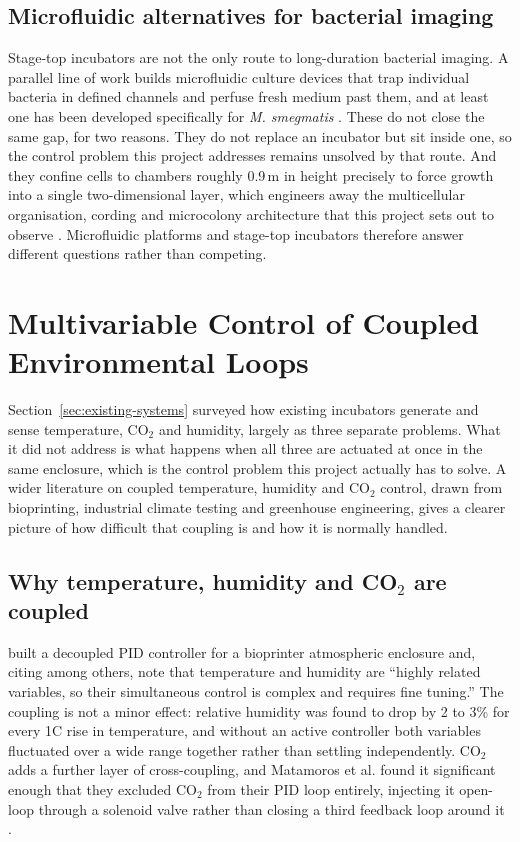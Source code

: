 \subsection{Microfluidic alternatives for bacterial imaging}
\label{subsec:microfluidic-alternatives}

Stage-top incubators are not the only route to long-duration bacterial imaging. A parallel line of work builds microfluidic culture devices that trap individual bacteria in defined channels and perfuse fresh medium past them, and at least one has been developed specifically for \textit{M. smegmatis} \citep{wang2021development,golchin_microfluidic_2012}. These do not close the same gap, for two reasons. They do not replace an incubator but sit inside one, so the control problem this project addresses remains unsolved by that route. And they confine cells to chambers roughly 0.9\,\textmu m in height precisely to force growth into a single two-dimensional layer, which engineers away the multicellular organisation, cording and microcolony architecture that this project sets out to observe \citep{wang2021development}. Microfluidic platforms and stage-top incubators therefore answer different questions rather than competing.

\section{Multivariable Control of Coupled Environmental Loops}
\label{sec:multivariable-control}

Section~\ref{sec:existing-systems} surveyed how existing incubators generate and sense temperature, CO$_2$ and humidity, largely as three separate problems. What it did not address is what happens when all three are actuated at once in the same enclosure, which is the control problem this project actually has to solve. A wider literature on coupled temperature, humidity and CO$_2$ control, drawn from bioprinting, industrial climate testing and greenhouse engineering, gives a clearer picture of how difficult that coupling is and how it is normally handled.

\subsection{Why temperature, humidity and CO$_2$ are coupled}
\label{subsec:why-coupled}

\citet{matamoros_temperature_2020} built a decoupled PID controller for a bioprinter atmospheric enclosure and, citing \citet{yinping_expert_2017} among others, note that temperature and humidity are ``highly related variables, so their simultaneous control is complex and requires fine tuning.'' The coupling is not a minor effect: relative humidity was found to drop by 2 to 3\% for every 1\textdegree{}C rise in temperature, and without an active controller both variables fluctuated over a wide range together rather than settling independently. CO$_2$ adds a further layer of cross-coupling, and Matamoros et al. found it significant enough that they excluded CO$_2$ from their PID loop entirely, injecting it open-loop through a solenoid valve rather than closing a third feedback loop around it \citep{matamoros_temperature_2020}.

